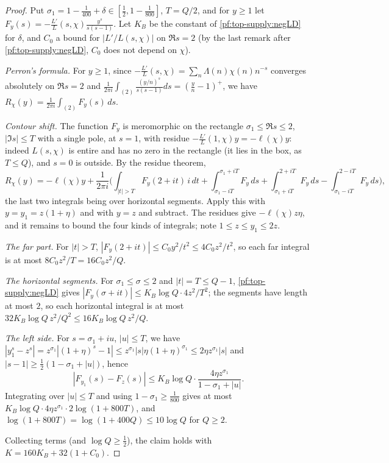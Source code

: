 \begin{proof}
Put $\sigma_1=1-\frac1{400}+\delta\in[\frac12,1-\frac1{800}]$, $T=Q/2$, and for $y\ge1$ let
$F_y(s)=-\frac{L'}L(s,\chi)\frac{y^s}{s(s-1)}$. Let $K_B$ be the constant of \cref{pf:top-supply:negLD} for $\delta$,
and $C_0$ a bound for $|L'/L(s,\chi)|$ on $\Re s=2$ (by the last remark after \cref{pf:top-supply:negLD}, $C_0$ does
not depend on $\chi$).

\emph{Perron's formula.} For $y\ge1$, since $-\frac{L'}L(s,\chi)=\sum_n\Lambda(n)\chi(n)n^{-s}$ converges absolutely on
$\Re s=2$ and $\frac1{2\pi i}\int_{(2)}\frac{(y/n)^s}{s(s-1)}ds=(\frac yn-1)^+$, we have
$R_\chi(y)=\frac1{2\pi i}\int_{(2)}F_y(s)\,ds$.

\emph{Contour shift.} The function $F_y$ is meromorphic on the rectangle $\sigma_1\le\Re s\le2$, $|\Im s|\le T$ with a
single pole, at $s=1$, with residue $-\frac{L'}L(1,\chi)y=-\ell(\chi)y$: indeed $L(s,\chi)$ is entire and has no zero in
the rectangle (it lies in the box, as $T\le Q$), and $s=0$ is outside. By the residue theorem,
\[
R_\chi(y)=-\ell(\chi)y+\frac1{2\pi i}\Big(\int_{|t|>T}F_y(2+it)\,i\,dt+\int_{\sigma_1-iT}^{\sigma_1+iT}F_y\,ds
+\int_{\sigma_1+iT}^{2+iT}F_y\,ds-\int_{\sigma_1-iT}^{2-iT}F_y\,ds\Big),
\]
the last two integrals being over horizontal segments. Apply this with $y=y_1=z(1+\eta)$ and with $y=z$ and subtract.
The residues give $-\ell(\chi)z\eta$, and it remains to bound the four kinds of integrals; note $1\le z\le y_1\le2z$.

\emph{The far part.} For $|t|>T$, $|F_y(2+it)|\le C_0y^2/t^2\le4C_0z^2/t^2$, so each far integral is at most
$8C_0z^2/T=16C_0z^2/Q$.

\emph{The horizontal segments.} For $\sigma_1\le\sigma\le2$ and $|t|=T\le Q-1$, \cref{pf:top-supply:negLD} gives
$|F_y(\sigma+it)|\le K_B\log Q\cdot4z^2/T^2$; the segments have length at most $2$, so each horizontal integral is at most
$32K_B\log Q\,z^2/Q^2\le16K_B\log Q\,z^2/Q$.

\emph{The left side.} For $s=\sigma_1+iu$, $|u|\le T$, we have $|y_1^s-z^s|=z^{\sigma_1}|(1+\eta)^s-1|\le
z^{\sigma_1}|s|\eta(1+\eta)^{\sigma_1}\le2\eta z^{\sigma_1}|s|$ and $|s-1|\ge\frac12(1-\sigma_1+|u|)$, hence
\[
|F_{y_1}(s)-F_z(s)|\le K_B\log Q\cdot\frac{4\eta z^{\sigma_1}}{1-\sigma_1+|u|}.
\]
Integrating over $|u|\le T$ and using $1-\sigma_1\ge\frac1{800}$ gives at most
$K_B\log Q\cdot4\eta z^{\sigma_1}\cdot2\log(1+800T)$, and $\log(1+800T)=\log(1+400Q)\le10\log Q$ for $Q\ge2$.

Collecting terms (and $\log Q\ge\frac12$), the claim holds with $K=160K_B+32(1+C_0)$.
\end{proof}

